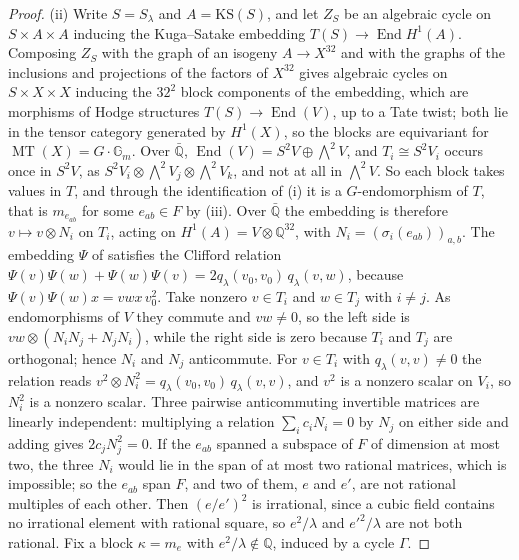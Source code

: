 \documentclass[11pt,reqno]{amsart}
\theoremstyle{plain}
\theoremstyle{definition}
\theoremstyle{remark}
\newcommand{\QQ}{\mathbb{Q}}
\DeclareMathOperator{\End}{End}
\DeclareMathOperator{\MT}{MT}
\begin{document}
\begin{proof}
(ii) Write $S=S_{\lambda}$ and $A=\mathrm{KS}(S)$, and let $Z_{S}$ be an
algebraic cycle on $S\times A\times A$ inducing the Kuga--Satake embedding
$T(S)\to\End H^{1}(A)$. Composing $Z_{S}$ with the graph of an isogeny
$A\to X^{32}$ and with the graphs of the inclusions and projections of the
factors of $X^{32}$ gives algebraic cycles on $S\times X\times X$ inducing the
$32^{2}$ block components of the embedding, which are morphisms of Hodge
structures $T(S)\to\End(V)$, up to a Tate twist; both lie in the tensor
category generated by $H^{1}(X)$, so the blocks are equivariant for
$\MT(X)=G\cdot\mathbb{G}_{m}$. Over $\bar{\QQ}$,
$\End(V)=S^{2}V\oplus\bigwedge^{2}V$, and $T_{i}\cong S^{2}V_{i}$ occurs once
in $S^{2}V$, as $S^{2}V_{i}\otimes\bigwedge^{2}V_{j}\otimes\bigwedge^{2}V_{k}$,
and not at all in $\bigwedge^{2}V$. So each block takes values in $T$, and
through the identification of (i) it is a $G$-endomorphism of $T$, that is
$m_{e_{ab}}$ for some $e_{ab}\in F$ by (iii). Over
$\bar{\QQ}$ the embedding is therefore $v\mapsto v\otimes N_{i}$ on $T_{i}$,
acting on $H^{1}(A)=V\otimes\QQ^{32}$, with
$N_{i}=(\sigma_{i}(e_{ab}))_{a,b}$. The embedding $\Psi$ of
\cite[Proposition~11.7]{paperI} satisfies the Clifford relation
$\Psi(v)\Psi(w)+\Psi(w)\Psi(v)=2q_{\lambda}(v_{0},v_{0})\,q_{\lambda}(v,w)$,
because
$\Psi(v)\Psi(w)x=vwx\,v_{0}^{2}$. Take nonzero $v\in T_{i}$ and
$w\in T_{j}$ with $i\ne j$. As endomorphisms of $V$ they commute and $vw\ne0$,
so the left side is $vw\otimes(N_{i}N_{j}+N_{j}N_{i})$, while the right side
is zero because $T_{i}$ and $T_{j}$ are orthogonal; hence $N_{i}$ and $N_{j}$
anticommute. For $v\in T_{i}$ with $q_{\lambda}(v,v)\ne0$ the relation reads
$v^{2}\otimes N_{i}^{2}=q_{\lambda}(v_{0},v_{0})\,q_{\lambda}(v,v)$, and $v^{2}$
is a nonzero scalar on $V_{i}$, so $N_{i}^{2}$ is a nonzero scalar. Three pairwise
anticommuting invertible matrices are linearly independent: multiplying a
relation $\sum_{i}c_{i}N_{i}=0$ by $N_{j}$ on either side and adding gives
$2c_{j}N_{j}^{2}=0$. If the $e_{ab}$ spanned a subspace of $F$ of dimension at
most two, the three $N_{i}$ would lie in the span of at most two rational
matrices, which is impossible; so the $e_{ab}$ span $F$, and two of them, $e$
and $e'$, are not rational multiples of each other. Then $(e/e')^{2}$ is irrational, since a cubic field
contains no irrational element with rational square, so $e^{2}/\lambda$ and
$e'^{2}/\lambda$ are not both rational. Fix a block $\kappa=m_{e}$ with
$e^{2}/\lambda\notin\QQ$, induced by a cycle $\Gamma$.


\end{proof}
\end{document}
